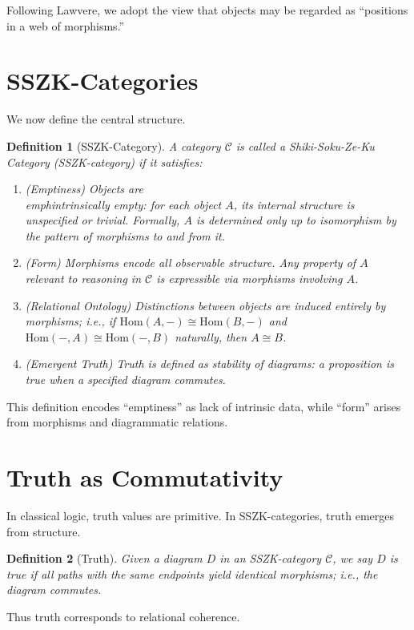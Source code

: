 \documentclass[11pt]{article}
\newtheorem{definition}{Definition}
\begin{document}
Following Lawvere, we adopt the view that objects may be regarded as ``positions in a web of morphisms.''

\section{SSZK-Categories}
We now define the central structure.

\begin{definition}[SSZK-Category]
A category $\mathcal{C}$ is called a Shiki-Soku-Ze-Ku Category (SSZK-category) if it satisfies:
\begin{enumerate}
    \item (Emptiness) Objects are \\emph{intrinsically empty}: for each object $A$, its internal structure is unspecified or trivial. Formally, $A$ is determined only up to isomorphism by the pattern of morphisms to and from it.
    \item (Form) Morphisms encode all observable structure. Any property of $A$ relevant to reasoning in $\mathcal{C}$ is expressible via morphisms involving $A$.
    \item (Relational Ontology) Distinctions between objects are induced entirely by morphisms; i.e., if $\mathrm{Hom}(A,-) \cong \mathrm{Hom}(B,-)$ and $\mathrm{Hom}(-,A) \cong \mathrm{Hom}(-,B)$ naturally, then $A \cong B$.
    \item (Emergent Truth) Truth is defined as stability of diagrams: a proposition is true when a specified diagram commutes.
\end{enumerate}
\end{definition}

This definition encodes ``emptiness'' as lack of intrinsic data, while ``form'' arises from morphisms and diagrammatic relations.

\section{Truth as Commutativity}
In classical logic, truth values are primitive. In SSZK-categories, truth emerges from structure.

\begin{definition}[Truth]
Given a diagram $D$ in an SSZK-category $\mathcal{C}$, we say $D$ is \emph{true} if all paths with the same endpoints yield identical morphisms; i.e., the diagram commutes.
\end{definition}

Thus truth corresponds to relational coherence.
\end{document}
